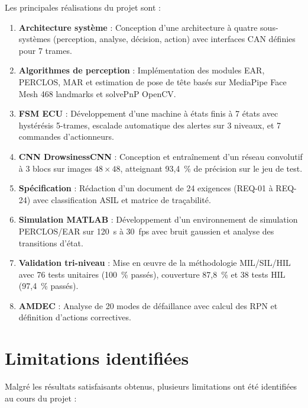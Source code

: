 \documentclass[12pt,a4paper]{report}
\begin{document}
Les principales r\'ealisations du projet sont :

\begin{enumerate}
  \item \textbf{Architecture syst\`eme} : Conception d'une architecture \`a quatre sous-syst\`emes (perception, analyse, d\'ecision, action) avec interfaces CAN d\'efinies pour 7 trames.

  \item \textbf{Algorithmes de perception} : Impl\'ementation des modules EAR, PERCLOS, MAR et estimation de pose de t\^ete bas\'es sur MediaPipe Face Mesh 468 landmarks et solvePnP OpenCV.

  \item \textbf{FSM ECU} : D\'eveloppement d'une machine \`a \'etats finis \`a 7 \'etats avec hyst\'er\'esis 5-trames, escalade automatique des alertes sur 3 niveaux, et 7 commandes d'actionneurs.

  \item \textbf{CNN DrowsinessCNN} : Conception et entra\^inement d'un r\'eseau convolutif \`a 3 blocs sur images $48\times48$, atteignant 93{,}4~\% de pr\'ecision sur le jeu de test.

  \item \textbf{Sp\'ecification} : R\'edaction d'un document de 24 exigences (REQ-01 \`a REQ-24) avec classification ASIL et matrice de tra\c{c}abilit\'e.

  \item \textbf{Simulation MATLAB} : D\'eveloppement d'un environnement de simulation PERCLOS/EAR sur 120~s \`a 30~fps avec bruit gaussien et analyse des transitions d'\'etat.

  \item \textbf{Validation tri-niveau} : Mise en \oe uvre de la m\'ethodologie MIL/SIL/HIL avec 76 tests unitaires (100~\% pass\'es), couverture 87{,}8~\% et 38 tests HIL (97{,}4~\% pass\'es).

  \item \textbf{AMDEC} : Analyse de 20 modes de d\'efaillance avec calcul des RPN et d\'efinition d'actions correctives.
\end{enumerate}

\section{Limitations identifi\'ees}

Malgr\'e les r\'esultats satisfaisants obtenus, plusieurs limitations ont \'et\'e identifi\'ees au cours du projet :
\end{document}

